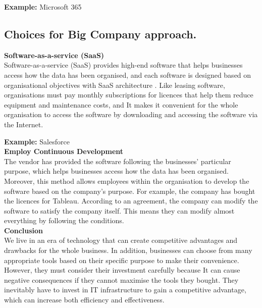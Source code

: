 \documentclass[12pt,a4paper]{article}
\begin{document}
\noindent\textbf{Example:} Microsoft 365

\subsection{Choices for Big Company approach.}

\textbf{Software-as-a-service (SaaS)}\\
Software-as-a-service (SaaS) provides high-end software that helps businesses access how the data has been organised, and each software is designed based on organisational objectives with SaaS architecture \citep{question_5.2}. Like leasing software, organisations must pay monthly subscriptions for licences that help them reduce equipment and maintenance costs, and It makes it convenient for the whole organisation to access the software by downloading and accessing the software via the Internet.

\noindent\textbf{Example:} Salesforce\\

\noindent\textbf{Employ Continuous Development}\\
The vendor has provided the software following the businesses' particular purpose, which helps businesses access how the data has been organised. Moreover, this method allows employees within the organisation to develop the software based on the company's purpose. For example, the company has bought the licences for Tableau. According to an agreement, the company can modify the software to satisfy the company itself. This means they can modify almost everything by following the conditions. \\

\noindent\textbf{Conclusion}\\
We live in an era of technology that can create competitive advantages and drawbacks for the whole business. In addition, businesses can choose from many appropriate tools based on their specific purpose to make their convenience. However, they must consider their investment carefully because It can cause negative consequences if they cannot maximise the tools they bought. They inevitably have to invest in IT infrastructure to gain a competitive advantage, which can increase both efficiency and effectiveness.


\pagebreak



	
\def\UrlBreaks{\do\/\do-}

\clearpage
\end{document}
